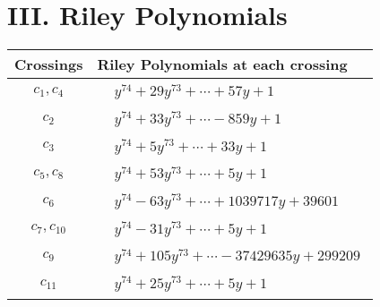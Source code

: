 \documentclass[1p]{elsarticle_modified}
\theoremstyle{definition}
\begin{document}
\centering \section*{ III. Riley Polynomials}
\begin{tabular}{m{50pt}|m{274pt}}
Crossings & \hspace{64pt}Riley Polynomials at each crossing \\
\hline $$\begin{aligned}c_{1},c_{4}\end{aligned}$$&$\begin{aligned}
&y^{74}+29 y^{73}+\cdots+57 y+1
\end{aligned}$\\
\hline $$\begin{aligned}c_{2}\end{aligned}$$&$\begin{aligned}
&y^{74}+33 y^{73}+\cdots-859 y+1
\end{aligned}$\\
\hline $$\begin{aligned}c_{3}\end{aligned}$$&$\begin{aligned}
&y^{74}+5 y^{73}+\cdots+33 y+1
\end{aligned}$\\
\hline $$\begin{aligned}c_{5},c_{8}\end{aligned}$$&$\begin{aligned}
&y^{74}+53 y^{73}+\cdots+5 y+1
\end{aligned}$\\
\hline $$\begin{aligned}c_{6}\end{aligned}$$&$\begin{aligned}
&y^{74}-63 y^{73}+\cdots+1039717 y+39601
\end{aligned}$\\
\hline $$\begin{aligned}c_{7},c_{10}\end{aligned}$$&$\begin{aligned}
&y^{74}-31 y^{73}+\cdots+5 y+1
\end{aligned}$\\
\hline $$\begin{aligned}c_{9}\end{aligned}$$&$\begin{aligned}
&y^{74}+105 y^{73}+\cdots-37429635 y+299209
\end{aligned}$\\
\hline $$\begin{aligned}c_{11}\end{aligned}$$&$\begin{aligned}
&y^{74}+25 y^{73}+\cdots+5 y+1
\end{aligned}$\\
\hline
\end{tabular}
\vskip 2pc
\end{document}
